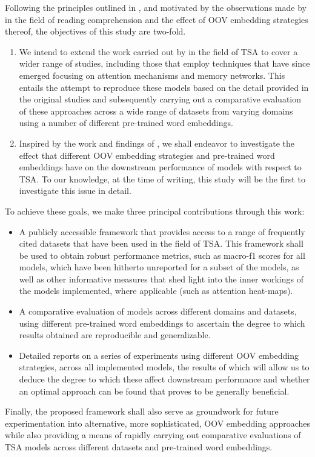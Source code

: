 \documentclass[../../fyp.tex]{subfiles}
\begin{document}
Following the principles outlined in \cite{moore2018}, and motivated by the observations made by \cite{bhuwandhingra2017} in the field of reading comprehension and the effect of OOV embedding strategies thereof, the objectives of this study are two-fold.

\begin{enumerate}
	\item We intend to extend the work carried out by \cite{moore2018} in the field of TSA to cover a wider range of studies, including those that employ techniques that have since emerged focusing on attention mechanisms and memory networks. This entails the attempt to reproduce these models based on the detail provided in the original studies and subsequently carrying out a comparative evaluation of these approaches across a wide range of datasets from varying domains using a number of different pre-trained word embeddings.
	\item Inspired by the work and findings of \cite{bhuwandhingra2017}, we shall endeavor to investigate the effect that different OOV embedding strategies and pre-trained word embeddings have on the downstream performance of models with respect to TSA. To our knowledge, at the time of writing, this study will be the first to investigate this issue in detail.
\end{enumerate}

To achieve these goals, we make three principal contributions through this work:
\begin{itemize}
	\item A publicly accessible framework that provides access to a range of frequently cited datasets that have been used in the field of TSA. This framework shall be used to obtain robust performance metrics, such as macro-f1 scores for all models, which have been hitherto unreported for a subset of the models, as well as other informative measures that shed light into the inner workings of the models implemented, where applicable (such as attention heat-maps).
	\item A comparative evaluation of models across different domains and datasets, using different pre-trained word embeddings to ascertain the degree to which results obtained are reproducible and generalizable.
	\item Detailed reports on a series of experiments using different OOV embedding strategies, across all implemented models, the results of which will allow us to deduce the degree to which these affect downstream performance and whether an optimal approach can be found that proves to be generally beneficial.
\end{itemize}

Finally, the proposed framework shall also serve as groundwork for future experimentation into alternative, more sophisticated, OOV embedding approaches while also providing a means of rapidly carrying out comparative evaluations of TSA models across different datasets and pre-trained word embeddings.
\end{document}
